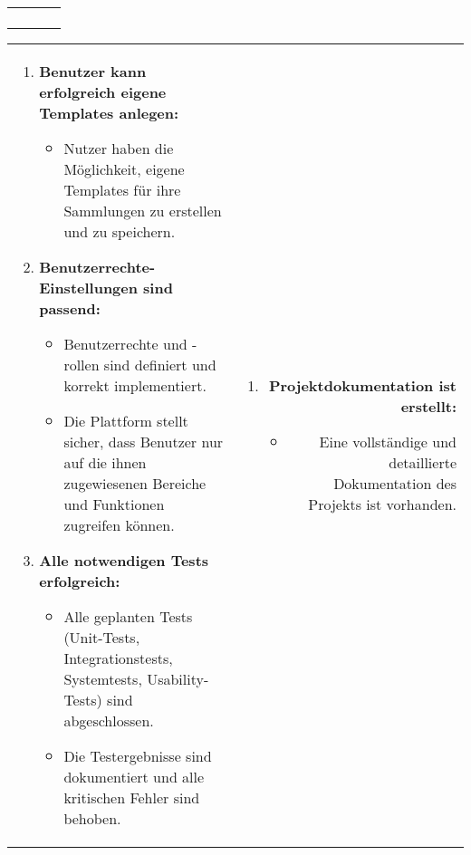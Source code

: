 \begin{tabularx}{\textwidth}{L R}
\begin{enumerate}[left=0pt,label=\arabic*.,itemsep=0.4cm]
        \end{enumerate}
    \end{tabularx}

    \newpage
    \vspace{0.5cm}
    \begin{tabularx}{\textwidth}{L R}
        \begin{enumerate}[left=0pt,label=\arabic*.,itemsep=0.4cm]]
            \setcounter{enumi}{11}
            \small
            \item \textbf{Benutzer kann erfolgreich eigene Templates anlegen:}
            \begin{itemize}[label=--]
                \item Nutzer haben die Möglichkeit, eigene Templates für ihre Sammlungen zu erstellen und zu speichern.
            \end{itemize}

            \item \textbf{Benutzerrechte-Einstellungen sind passend:}
            \begin{itemize}[label=--]
                \item Benutzerrechte und -rollen sind definiert und korrekt implementiert.
                \item Die Plattform stellt sicher, dass Benutzer nur auf die ihnen zugewiesenen Bereiche und Funktionen zugreifen können.
            \end{itemize}

            \item \textbf{Alle notwendigen Tests erfolgreich:}
            \begin{itemize}[label=--]
                \item Alle geplanten Tests (Unit-Tests, Integrationstests, Systemtests, Usability-Tests) sind abgeschlossen.
                \item Die Testergebnisse sind dokumentiert und alle kritischen Fehler sind behoben.
            \end{itemize}

        \end{enumerate}
        &
        \begin{enumerate}[left=0pt,label=\arabic*.,itemsep=0.4cm]]
            \setcounter{enumi}{14}
            \small
            \item \textbf{Projektdokumentation ist erstellt:}
            \begin{itemize}[label=--]
                \item Eine vollständige und detaillierte Dokumentation des Projekts ist vorhanden.
            \end{itemize}


\end{enumerate}
\end{tabularx}
